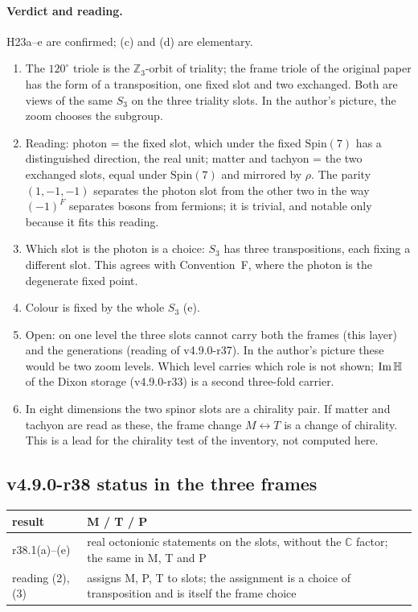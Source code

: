 \paragraph{Verdict and reading.}
H23a--e are confirmed; (c) and (d) are elementary.
\begin{enumerate}[leftmargin=2em]
\item The \(120^\circ\) triole is the \(\mathbb Z_3\)-orbit of triality; the frame triole of the original paper has the form of a
transposition, one fixed slot and two exchanged.  Both are views of the same \(S_3\) on the three triality slots.  In the author's
picture, the zoom chooses the subgroup.
\item Reading: photon = the fixed slot, which under the fixed \(\mathrm{Spin}(7)\) has a distinguished direction, the real unit;
matter and tachyon = the two exchanged slots, equal under \(\mathrm{Spin}(7)\) and mirrored by \(\rho\).  The parity \((1,-1,-1)\)
separates the photon slot from the other two in the way \((-1)^F\) separates bosons from fermions; it is trivial, and notable only
because it fits this reading.
\item Which slot is the photon is a choice: \(S_3\) has three transpositions, each fixing a different slot.  This agrees with
Convention~F, where the photon is the degenerate fixed point.
\item Colour is fixed by the whole \(S_3\) (e).
\item Open: on one level the three slots cannot carry both the frames (this layer) and the generations (reading of v4.9.0-r37).  In
the author's picture these would be two zoom levels.  Which level carries which role is not shown; \(\operatorname{Im}\mathbb{H}\) of the
Dixon storage (v4.9.0-r33) is a second three-fold carrier.
\item In eight dimensions the two spinor slots are a chirality pair.  If matter and tachyon are read as these, the frame change
\(M\leftrightarrow T\) is a change of chirality.  This is a lead for the chirality test of the inventory, not computed here.
\end{enumerate}

\subsection*{v4.9.0-r38 status in the three frames}
\label{subsec:v490-r38-frames}

\begin{center}
\small
\begin{tabular}{@{}>{\raggedright\arraybackslash}p{}>{\raggedright\arraybackslash}p{}@{}}
\toprule
result & M / T / P\\
\midrule
r38.1(a)--(e) & real octonionic statements on the slots, without the \(\mathbb C\) factor; the same in M, T and P\\
reading (2), (3) & assigns M, P, T to slots; the assignment is a choice of transposition and is itself the frame choice\\
\bottomrule
\end{tabular}
\end{center}


